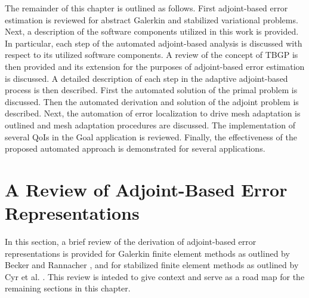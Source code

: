 The remainder of this chapter is outlined as follows.
First adjoint-based error estimation is reviewed for abstract
Galerkin and stabilized variational problems.
Next, a description of the software components utilized in this
work is provided. In particular, each step of the automated
adjoint-based analysis is discussed with respect to its utilized software
components. A review of the concept of TBGP is then provided
and its extension for the purposes of adjoint-based error estimation
is discussed. A detailed description of each step in the
adaptive adjoint-based process is then described. First the
automated solution of the primal problem is discussed. Then
the automated derivation and solution of the adjoint problem
is described. Next, the automation of error localization to
drive mesh adaptation is outlined and mesh adaptation procedures
are discussed. The implementation of several QoIs in the Goal
application is reviewed. Finally, the effectiveness of the
proposed automated approach is demonstrated for several
applications.

\section{A Review of Adjoint-Based Error Representations}

In this section, a brief review of the derivation of adjoint-based
error representations is provided for Galerkin finite element methods as
outlined by Becker and Rannacher \cite{becker2001optimal}, and for
stabilized finite element methods as outlined by Cyr et al. \cite{cyr2014approaches}.
This review is inteded to give context and serve as a road map for the remaining
sections in this chapter.

